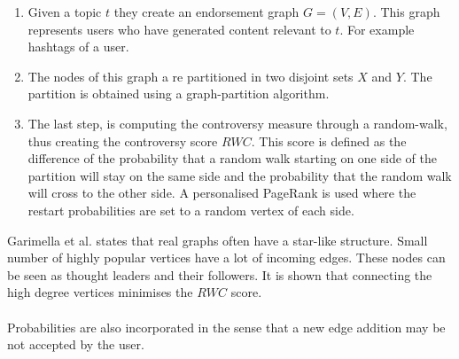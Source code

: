 \begin{enumerate}
  \item Given a topic $t$ they create an endorsement graph $G=(V,E)$. This graph represents users who have generated content relevant to $t$. For example hashtags of a user.
  
  \item The nodes of this graph a re partitioned in two disjoint sets $X$ and $Y$. The partition is obtained using a graph-partition algorithm.
  
  \item The last step, is computing the controversy measure through a random-walk, thus creating the controversy score $RWC$. This score is defined as the difference of the probability that a random walk starting on one side of the partition will stay on the same side and the probability that the random walk will cross to the other side. A personalised PageRank is used where the restart probabilities are set to a random vertex of each side.
\end{enumerate}
\vspace{4pt}
Garimella et al. states that real graphs often have a star-like structure. Small number of highly popular vertices have a lot of incoming edges. These nodes can be seen as thought leaders and their followers. It is shown that connecting the high degree vertices minimises the $RWC$ score.
\\
\\
Probabilities are also incorporated in the sense that a new edge addition may be not accepted by the user. \cite{garimella}
